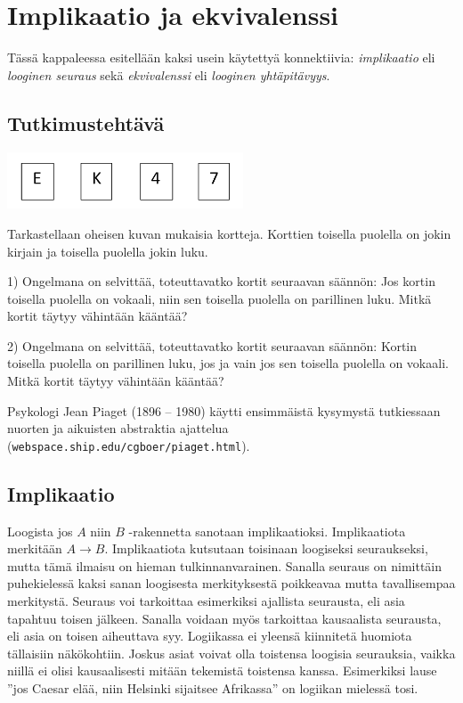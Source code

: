

\section{Implikaatio ja ekvivalenssi}
Tässä kappaleessa esitellään kaksi usein käytettyä konnektiivia: {\em implikaatio} eli {\em looginen seuraus} sekä {\em ekvivalenssi} eli {\em looginen yhtäpitävyys}.

\subsection*{Tutkimustehtävä}

\begin{center}
\includegraphics[width=7cm]{pictures/piaget}
\end{center}

Tarkastellaan oheisen kuvan mukaisia kortteja. Korttien toisella puolella on jokin kirjain ja toisella puolella jokin luku.

1) Ongelmana on selvittää, toteuttavatko kortit seuraavan säännön: Jos kortin toisella puolella on vokaali, niin sen toisella puolella on parillinen luku. Mitkä kortit täytyy vähintään kääntää?

2) Ongelmana on selvittää, toteuttavatko kortit seuraavan säännön: Kortin toisella puolella on parillinen luku, jos ja vain jos sen toisella puolella on vokaali. Mitkä kortit täytyy vähintään kääntää?

Psykologi Jean Piaget (1896 -- 1980) käytti ensimmäistä kysymystä tutkiessaan nuorten ja aikuisten abstraktia ajattelua ({\tt webspace.ship.edu/cgboer/piaget.html}).

\subsection*{Implikaatio}

Loogista jos $A$ niin $B$ -rakennetta sanotaan implikaatioksi. Implikaatiota merkitään $A\to B$. Implikaatiota  kutsutaan toisinaan loogiseksi seu\-rauk\-sek\-si, mutta tämä ilmaisu on hieman tulkinnanvarainen. Sanalla seuraus on nimittäin puhekielessä kaksi sanan loogisesta merkityksestä poikkeavaa mutta tavallisempaa merkitystä. Seuraus voi tarkoittaa esimerkiksi ajallista seurausta, eli asia tapahtuu toisen jälkeen. Sanalla voidaan myös tarkoittaa kausaalista seurausta, eli asia on toisen aiheuttava syy. Logiikassa ei yleensä kiinnitetä huomiota tällaisiin näkökohtiin. Joskus asiat voivat olla toistensa loogisia seurauksia, vaikka niillä ei olisi kausaalisesti mitään tekemistä toistensa kanssa. Esimerkiksi lause ''jos Caesar elää, niin Helsinki sijaitsee Afrikassa'' on logiikan mielessä tosi. 


